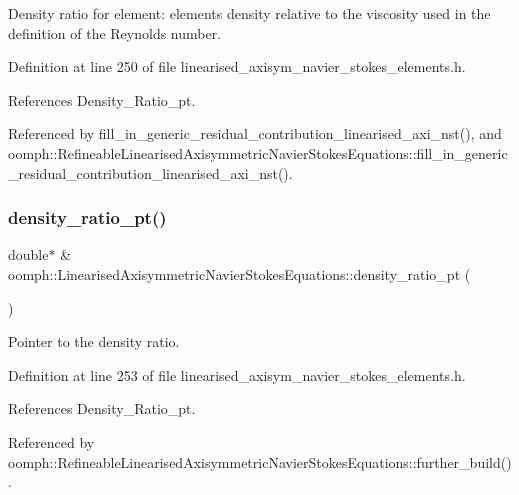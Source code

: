 Density ratio for element\+: element\textquotesingle{}s density relative to the viscosity used in the definition of the Reynolds number. 



Definition at line 250 of file linearised\+\_\+axisym\+\_\+navier\+\_\+stokes\+\_\+elements.\+h.



References Density\+\_\+\+Ratio\+\_\+pt.



Referenced by fill\+\_\+in\+\_\+generic\+\_\+residual\+\_\+contribution\+\_\+linearised\+\_\+axi\+\_\+nst(), and oomph\+::\+Refineable\+Linearised\+Axisymmetric\+Navier\+Stokes\+Equations\+::fill\+\_\+in\+\_\+generic\+\_\+residual\+\_\+contribution\+\_\+linearised\+\_\+axi\+\_\+nst().

\mbox{\label{classoomph_1_1LinearisedAxisymmetricNavierStokesEquations_a35ae96c21efc8d98cd2b62e46d356bef}} 
\subsubsection{\texorpdfstring{density\+\_\+ratio\+\_\+pt()}{density\_ratio\_pt()}}
{\footnotesize\ttfamily double$\ast$ \& oomph\+::\+Linearised\+Axisymmetric\+Navier\+Stokes\+Equations\+::density\+\_\+ratio\+\_\+pt (\begin{DoxyParamCaption}{ }\end{DoxyParamCaption})\hspace{0.3cm}{\ttfamily [inline]}}



Pointer to the density ratio. 



Definition at line 253 of file linearised\+\_\+axisym\+\_\+navier\+\_\+stokes\+\_\+elements.\+h.



References Density\+\_\+\+Ratio\+\_\+pt.



Referenced by oomph\+::\+Refineable\+Linearised\+Axisymmetric\+Navier\+Stokes\+Equations\+::further\+\_\+build().

